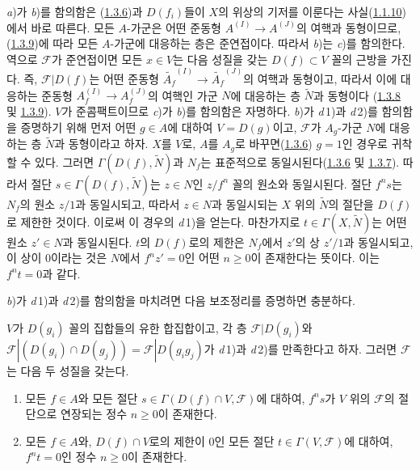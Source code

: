 \textit{a})가 \textit{b})를 함의함은
(\hyperref[I.1.3.6-ko]{1.3.6})과 $D(f_i)$들이 $X$의 위상의 기저를
이룬다는 사실(\hyperref[I.1.1.10-ko]{1.1.10})에서 바로 따른다.
모든 $A$-가군은 어떤 준동형 $A^{(I)}\to A^{(J)}$의 여핵과
동형이므로, (\hyperref[I.1.3.9-ko]{1.3.9})에 따라 모든 $A$-가군에
대응하는 층은 준연접이다. 따라서 \textit{b})는 \textit{c})를
함의한다. 역으로 $\mathscr{F}$가 준연접이면 모든 $x\in V$는 다음
성질을 갖는 $D(f)\subset V$ 꼴의 근방을 가진다. 즉,
$\mathscr{F}|D(f)$는 어떤 준동형
$\widetilde{A_f}^{(I)}\to\widetilde{A_f}^{(J)}$의 여핵과 동형이고,
따라서 이에 대응하는 준동형 $A_f^{(I)}\to A_f^{(J)}$의 여핵인
가군 $N$에 대응하는 층 $\widetilde{N}$과 동형이다
(\hyperref[I.1.3.8-ko]{1.3.8} 및
\hyperref[I.1.3.9-ko]{1.3.9}). $V$가 준콤팩트이므로
\textit{c})가 \textit{b})를 함의함은 자명하다.
\textit{b})가 \textit{d}\,1)과 \textit{d}\,2)를 함의함을
증명하기 위해 먼저 어떤 $g\in A$에 대하여 $V=D(g)$이고,
$\mathscr{F}$가 $A_g$-가군 $N$에 대응하는 층
$\widetilde{N}$과 동형이라고 하자. $X$를 $V$로, $A$를 $A_g$로
바꾸면(\hyperref[I.1.3.6-ko]{1.3.6}) $g=1$인 경우로 귀착할 수
있다. 그러면 $\Gamma(D(f),\widetilde{N})$과 $N_f$는 표준적으로
동일시된다(\hyperref[I.1.3.6-ko]{1.3.6} 및
\hyperref[I.1.3.7-ko]{1.3.7}). 따라서 절단
$s\in\Gamma(D(f),\widetilde{N})$는 $z\in N$인 $z/f^n$ 꼴의
원소와 동일시된다. 절단 $f^n s$는 $N_f$의 원소 $z/1$과
동일시되고, 따라서 $z\in N$과 동일시되는 $X$ 위의
$\widetilde{N}$의 절단을 $D(f)$로 제한한 것이다. 이로써 이 경우의
\textit{d}\,1)을 얻는다. 마찬가지로
$t\in\Gamma(X,\widetilde{N})$는 어떤 원소 $z'\in N$과 동일시된다.
$t$의 $D(f)$로의 제한은 $N_f$에서 $z'$의 상 $z'/1$과 동일시되고,
이 상이 $0$이라는 것은 $N$에서 $f^n z'=0$인 어떤 $n\geq0$이
존재한다는 뜻이다. 이는 $f^n t=0$과 같다.

\textit{b})가 \textit{d}\,1)과 \textit{d}\,2)를 함의함을
마치려면 다음 보조정리를 증명하면 충분하다.

\begin{lemma}[1.4.1.1]
\label{I.1.4.1.1-ko}
$V$가 $D(g_i)$ 꼴의 집합들의 유한 합집합이고, 각 층
$\mathscr{F}|D(g_i)$와
$\mathscr{F}|(D(g_i)\cap D(g_j))=\mathscr{F}|D(g_i g_j)$가
\textit{d}\,1)과 \textit{d}\,2)를 만족한다고 하자. 그러면
$\mathscr{F}$는 다음 두 성질을 갖는다.
\begin{enumerate}
  \item[\textit{d}'\,1)] 모든 $f\in A$와 모든 절단
  $s\in\Gamma(D(f)\cap V,\mathscr{F})$에 대하여, $f^n s$가
  $V$ 위의 $\mathscr{F}$의 절단으로 연장되는 정수 $n\geq0$이
  존재한다.
  \item[\textit{d}'\,2)] 모든 $f\in A$와, $D(f)\cap V$로의 제한이
  $0$인 모든 절단 $t\in\Gamma(V,\mathscr{F})$에 대하여,
  $f^n t=0$인 정수 $n\geq0$이 존재한다.
\end{enumerate}
\end{lemma}

